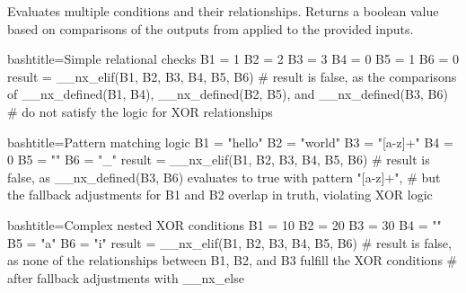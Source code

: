\begin{NexMainBox}
	\begin{NexMainBox}
		Evaluates multiple conditions and their relationships. Returns a boolean value based on comparisons of the outputs from  applied to the provided inputs.
	\end{NexMainBox}
	\begin{NexMainBox}
	\begin{NexListDark}
	\end{NexListDark}
	\end{NexMainBox}
\end{NexMainBox}

\begin{NexCodeBox}{bash}{title={Simple relational checks}}
	B1 = 1
	B2 = 2
	B3 = 3
	B4 = 0
	B5 = 1
	B6 = 0
	result = __nx_elif(B1, B2, B3, B4, B5, B6)
	# result is false, as the comparisons of __nx_defined(B1, B4), __nx_defined(B2, B5), and __nx_defined(B3, B6)
	# do not satisfy the logic for XOR relationships
\end{NexCodeBox}

\begin{NexCodeBox}{bash}{title={Pattern matching logic}}
	B1 = "hello"
	B2 = "world"
	B3 = "[a-z]+"
	B4 = 0
	B5 = ""
	B6 = "_"
	result = __nx_elif(B1, B2, B3, B4, B5, B6)
	# result is false, as __nx_defined(B3, B6) evaluates to true with pattern "[a-z]+",
	# but the fallback adjustments for B1 and B2 overlap in truth, violating XOR logic
\end{NexCodeBox}

\begin{NexCodeBox}{bash}{title={Complex nested XOR conditions}}
	B1 = 10
	B2 = 20
	B3 = 30
	B4 = ""
	B5 = "a"
	B6 = "i"
	result = __nx_elif(B1, B2, B3, B4, B5, B6)
	# result is false, as none of the relationships between B1, B2, and B3 fulfill the XOR conditions
	# after fallback adjustments with __nx_else
\end{NexCodeBox}

